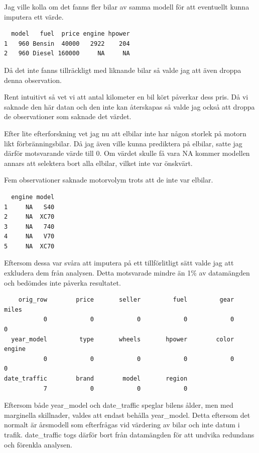 \documentclass[
  letterpaper,
  DIV=11,
  numbers=noendperiod]{scrreprt}
\begin{document}
Jag ville kolla om det fanns fler bilar av samma modell för att
eventuellt kunna imputera ett värde.

\begin{verbatim}
  model   fuel  price engine hpower
1   960 Bensin  40000   2922    204
2   960 Diesel 160000     NA     NA
\end{verbatim}

Då det inte fanns tillräckligt med liknande bilar så valde jag att även
droppa denna observation.

Rent intuitivt så vet vi att antal kilometer en bil kört påverkar dess
pris. Då vi saknade den här datan och den inte kan återskapas så valde
jag också att droppa de observationer som saknade det värdet.

Efter lite efterforskning vet jag nu att elbilar inte har någon storlek
på motorn likt förbränningsbilar. Då jag även ville kunna prediktera på
elbilar, satte jag därför motsvarande värde till 0. Om värdet skulle få
vara NA kommer modellen annars att selektera bort alla elbilar, vilket
inte var önskvärt.

Fem observationer saknade motorvolym trots att de inte var elbilar.

\begin{verbatim}
  engine model
1     NA   S40
2     NA  XC70
3     NA   740
4     NA   V70
5     NA  XC70
\end{verbatim}

Eftersom dessa var svåra att imputera på ett tillförlitligt sätt valde
jag att exkludera dem från analysen. Detta motsvarade mindre än 1\% av
datamängden och bedömdes inte påverka resultatet.

\begin{verbatim}
    orig_row        price       seller         fuel         gear        miles 
           0            0            0            0            0            0 
  year_model         type       wheels       hpower        color       engine 
           0            0            0            0            0            0 
date_traffic        brand        model       region 
           7            0            0            0 
\end{verbatim}

Eftersom både year\_model och date\_traffic speglar bilens ålder, men
med marginella skillnader, valdes att endast behålla year\_model. Detta
eftersom det normalt är årsmodell som efterfrågas vid värdering av bilar
och inte datum i trafik. date\_traffic togs därför bort från datamängden
för att undvika redundans och förenkla analysen.
\end{document}
